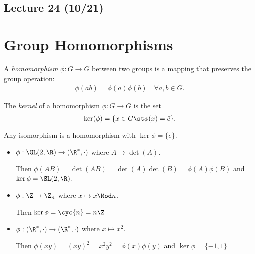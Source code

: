 \subsection*{Lecture 24 (10/21)} %
\section{Group Homomorphisms} %

\begin{definition}[homomorphism]
  A \emph{homomorphism} \(\phi: G\to \bar G\) between two groups is a mapping that preserves the group operation:
  \begin{align*}
      \phi(ab) = \phi(a)\phi(b)\quad \forall a,b\in G.
  \end{align*}
  \end{definition}

  \begin{definition}[kernel]
  The \emph{kernel} of a homomorphism \(\phi: G\to \bar G\) is the set
      \begin{align*}
          \ker(\phi) = \{x\in G \st \phi(x)=\bar e\}.
      \end{align*}
  \end{definition}

  \begin{example}
      Any isomorphism is a homomorphism with \(\ker\phi=\{e\}\).
  \end{example}

  \begin{examples}
  \begin{itemize}
      \item \(\phi:\GL(2,\R)\to (\R^*, \cdot)\) where \(A\mapsto \det(A)\).

      Then \(\phi(AB) = \det(AB) = \det(A)\det(B) = \phi(A)\phi(B)\) and \(\ker\phi = \SL(2,\R)\).

      \item \(\phi: \Z \to \Z_n\) where \(x\mapsto x\Mod n\).

      Then \(\ker\phi = \cyc{n} = n\Z\)

      \item \(\phi: (\R^*, \cdot)\to (\R^*, \cdot)\) where \(x\mapsto x^2\).

      Then \(\phi(xy)=(xy)^2 = x^2y^2=\phi(x)\phi(y)\) and \(\ker\phi = \{-1, 1\}\)
  \end{itemize}
  \end{examples}

